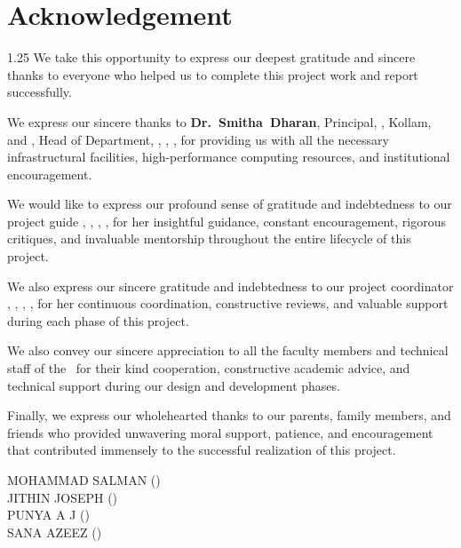 \chapter*{Acknowledgement}%
%
\vspace{-15pt}

\begin{spacing}{1.25}
\noindent We take this opportunity to express our deepest gratitude and sincere thanks to everyone who helped us to complete this project work and report successfully.

\vspace{6pt}

\noindent We express our sincere thanks to \mbox{\textbf{Dr.~Smitha Dharan}}, Principal, \college, Kollam, and \mbox{\textbf{\hod}}, Head of Department, \dept, \college, \collegeplace, for providing us with all the necessary infrastructural facilities, high-performance computing resources, and institutional encouragement.

\vspace{6pt}

\noindent We would like to express our profound sense of gratitude and indebtedness to our project guide \mbox{{\bfseries \guide}}, \guidedes, \dept, \college, for her insightful guidance, constant encouragement, rigorous critiques, and invaluable mentorship throughout the entire lifecycle of this project.

\vspace{6pt}

\noindent We also express our sincere gratitude and indebtedness to our project coordinator \mbox{\textbf{\coordinator}}, \coordinatordes, \dept, \college, for her continuous coordination, constructive reviews, and valuable support during each phase of this project.

\vspace{6pt}

\noindent We also convey our sincere appreciation to all the faculty members and technical staff of the \dept\ for their kind cooperation, constructive academic advice, and technical support during our design and development phases.

\vspace{6pt}

\noindent Finally, we express our wholehearted thanks to our parents, family members, and friends who provided unwavering moral support, patience, and encouragement that contributed immensely to the successful realization of this project.

\vspace*{14pt}
\begin{flushright}
MOHAMMAD SALMAN (\rollnoA) \\[3pt]
JITHIN JOSEPH (\rollnoB) \\[3pt]
PUNYA A J (\rollnoC) \\[3pt]
SANA AZEEZ (\rollnoD)
\end{flushright}
\end{spacing}

\thispagestyle{plain}
